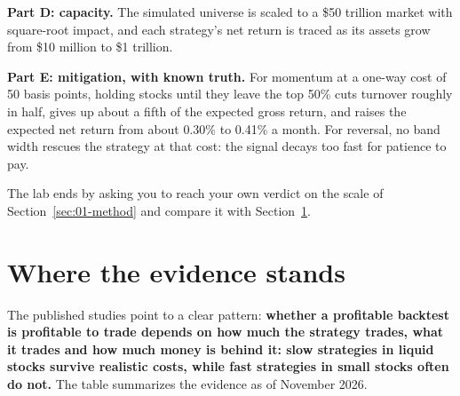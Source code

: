 \textbf{Part D: capacity.} The simulated universe is scaled to a \$50 trillion market with square-root impact, and each strategy's net return is traced as its assets grow from \$10 million to \$1 trillion.

\textbf{Part E: mitigation, with known truth.} For momentum at a one-way cost of 50 basis points, holding stocks until they leave the top 50\% cuts turnover roughly in half, gives up about a fifth of the expected gross return, and raises the expected net return from about 0.30\% to 0.41\% a month. For reversal, no band width rescues the strategy at that cost: the signal decays too fast for patience to pay.

The lab ends by asking you to reach your own verdict on the scale of Section~\ref{sec:01-method} and compare it with Section~\ref{sec:17-verdict}.

\section{Where the evidence stands}
\label{sec:17-verdict}

The published studies point to a clear pattern: \textbf{whether a profitable backtest is profitable to trade depends on how much the strategy trades, what it trades and how much money is behind it: slow strategies in liquid stocks survive realistic costs, while fast strategies in small stocks often do not.} The table summarizes the evidence as of November 2026.

